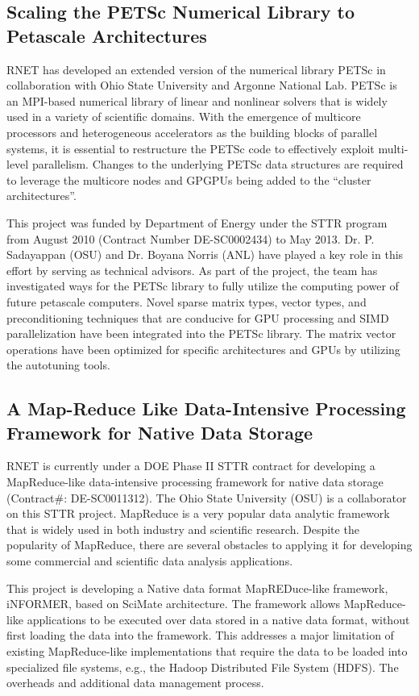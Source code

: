 \subsection{Scaling the PETSc Numerical Library to Petascale Architectures}

RNET has developed an extended version of the numerical library PETSc \cite{Lowell1} in
collaboration with Ohio State University and Argonne National Lab. PETSc is an MPI-based numerical library of
linear and nonlinear solvers that is widely used in a variety of scientific domains. With the
emergence of multicore processors and heterogeneous accelerators as the building blocks of
parallel systems, it is essential to restructure the PETSc code to effectively exploit multi-level
parallelism. Changes to the underlying PETSc data structures are required to leverage the multicore
nodes and GPGPUs being added to the ``cluster architectures''.

This project was funded by Department of Energy under the STTR program from August 2010 (Contract Number DE-SC0002434) 
to May 2013. Dr. P. Sadayappan (OSU) and Dr. Boyana Norris (ANL) have played a key role in this effort by serving as 
technical advisors. As part of the project, the team has investigated ways for the PETSc library to fully utilize the 
computing power of future petascale computers. Novel sparse matrix types,  vector types, and preconditioning techniques 
that are conducive for GPU processing and SIMD parallelization have been integrated into the PETSc library. The matrix 
vector operations have been optimized for specific architectures and GPUs by 
utilizing the autotuning tools.


\subsection{A Map-Reduce Like Data-Intensive Processing Framework for Native Data Storage}

RNET is currently under a DOE Phase II STTR contract for developing a MapReduce-like data-intensive processing framework 
for native data storage (Contract\#: DE-SC0011312). The Ohio State University (OSU) is a collaborator on this STTR project. 
MapReduce is a very popular data analytic framework that is widely used in both industry and scientific research. Despite 
the popularity of MapReduce, there are several obstacles to applying it for developing some commercial and scientific data 
analysis applications.

This project is developing a Native data format MapREDuce-like framework, iNFORMER, based on SciMate architecture. The 
framework allows MapReduce-like applications to be executed over data stored in a native data format, without first loading 
the data into the framework. This addresses a major limitation of existing MapReduce-like implementations that require the 
data to be loaded into specialized file systems, e.g., the Hadoop Distributed File System (HDFS). The overheads and additional
data management process.


